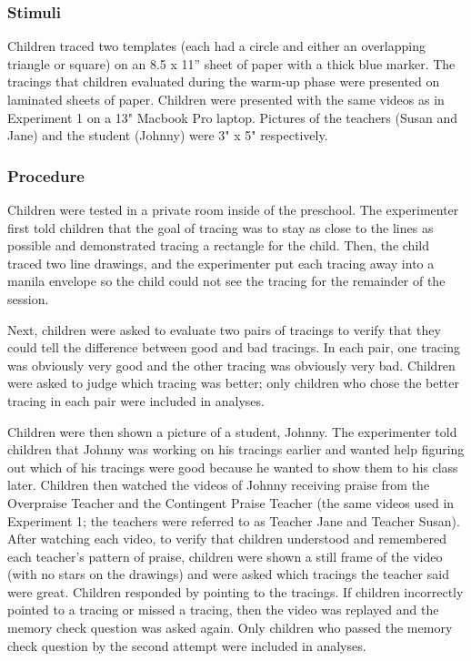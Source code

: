 \documentclass[10pt, letterpaper]{article}
\begin{document}
\subsubsection{Stimuli}\label{stimuli-1}

Children traced two templates (each had a circle and either an
overlapping triangle or square) on an 8.5 x 11'' sheet of paper with a
thick blue marker. The tracings that children evaluated during the
warm-up phase were presented on laminated sheets of paper. Children were
presented with the same videos as in Experiment 1 on a 13" Macbook Pro
laptop. Pictures of the teachers (Susan and Jane) and the student
(Johnny) were 3" x 5" respectively.

\subsubsection{Procedure}\label{procedure-1}

Children were tested in a private room inside of the preschool. The
experimenter first told children that the goal of tracing was to stay as
close to the lines as possible and demonstrated tracing a rectangle for
the child. Then, the child traced two line drawings, and the
experimenter put each tracing away into a manila envelope so the child
could not see the tracing for the remainder of the session.

Next, children were asked to evaluate two pairs of tracings to verify
that they could tell the difference between good and bad tracings. In
each pair, one tracing was obviously very good and the other tracing was
obviously very bad. Children were asked to judge which tracing was
better; only children who chose the better tracing in each pair were
included in analyses.

Children were then shown a picture of a student, Johnny. The
experimenter told children that Johnny was working on his tracings
earlier and wanted help figuring out which of his tracings were good
because he wanted to show them to his class later. Children then watched
the videos of Johnny receiving praise from the Overpraise Teacher and
the Contingent Praise Teacher (the same videos used in Experiment 1; the
teachers were referred to as Teacher Jane and Teacher Susan). After
watching each video, to verify that children understood and remembered
each teacher's pattern of praise, children were shown a still frame of
the video (with no stars on the drawings) and were asked which tracings
the teacher said were great. Children responded by pointing to the
tracings. If children incorrectly pointed to a tracing or missed a
tracing, then the video was replayed and the memory check question was
asked again. Only children who passed the memory check question by the
second attempt were included in analyses.
\end{document}
